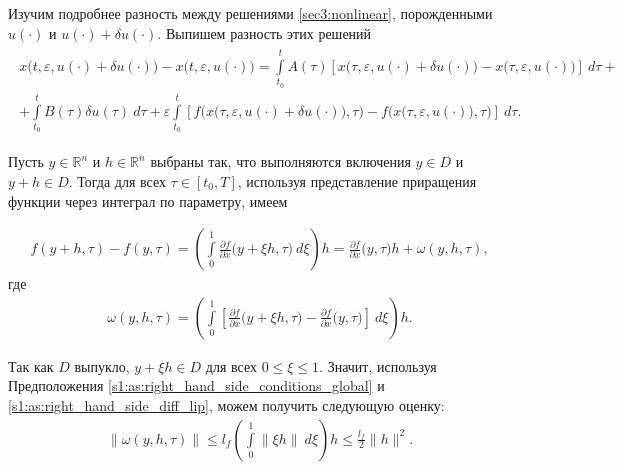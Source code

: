 \documentclass[../main.tex]{subfiles}
\begin{document}
Изучим подробнее разность между решениями \eqref{sec3:nonlinear}, порожденными $u(\cdot)$ и $u(\cdot) + \delta u(\cdot)$. 
Выпишем разность этих решений
\begin{gather}\label{diff_of_x}
 \begin{gathered}
 x\big(t,\varepsilon, u(\cdot) + \delta u(\cdot)\big) -
 x\big(t,\varepsilon, u(\cdot)\big) 
 = \int\limits_{t_0}^t A(\tau) \left[
 x\big(\tau,\varepsilon, u(\cdot) + \delta u(\cdot)\big) -
 x\big(\tau,\varepsilon, u(\cdot)\big) 
 \right]\ d\tau + \\ +
 \int\limits_{t_0}^t B(\tau) \delta u(\tau)\ d\tau +
 \varepsilon\int\limits_{t_0}^t \left[ 
 f\Big(x\big(\tau,\varepsilon, u(\cdot) + \delta u(\cdot)\big),\tau\Big) -
 f\Big(x\big(\tau,\varepsilon, u(\cdot)\big),\tau\Big)
 \right]\ d\tau.
 \end{gathered}
\end{gather}

Пусть $y \in \mathbb{R}^n$ и $h \in \mathbb{R}^n$ выбраны так, что выполняются включения $y\in D$ и $y+h \in D$. 
Тогда для всех $\tau \in [t_0,T]$, используя представление приращения функции через интеграл по параметру, имеем

\begin{gather*}
 f(y + h, \tau) - f(y,\tau) = 
 \left( \int\limits_{0}^{1} 
 \frac{\partial f}{\partial x} \big(y + \xi h, \tau\big)\ d\xi \right) h =
 \frac{\partial f}{\partial x} \big(y, \tau\big) h + \omega(y,h,\tau),
\end{gather*}
где 
\begin{gather*}
 \omega(y,h,\tau) = \left( \int\limits_{0}^{1} 
 \left[\frac{\partial f}{\partial x} \big(y + \xi h, \tau\big) -
 \frac{\partial f}{\partial x} \big(y, \tau\big) \right] \ d \xi \right) h.
\end{gather*}

Так как $D$ выпукло, $ y + \xi h \in D$ для всех $0 \leqslant \xi \leqslant 1$.
Значит, используя Предположения \ref{s1:as:right_hand_side_conditions_global} и \ref{s1:as:right_hand_side_diff_lip}, можем получить следующую оценку:
\begin{gather*}
 \|\omega(y,h,\tau)\| \leqslant l_f \left( \int\limits_0^1 \left\| \xi h \right\| \ d\xi \right)h \leqslant \frac{l_f}{2} \|h\|^2.
\end{gather*}
\end{document}
